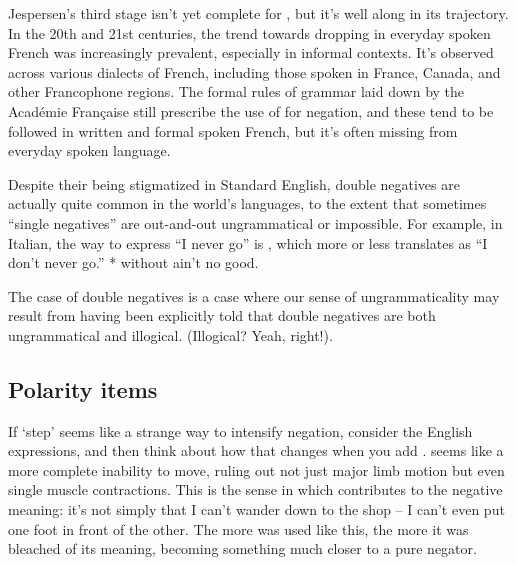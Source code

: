 Jespersen's third stage isn't yet complete for , but it's well along in its trajectory. In the 20th and 21st centuries, the trend towards  dropping in everyday spoken French was increasingly prevalent, especially in informal contexts. It's observed across various dialects of French, including those spoken in France, Canada, and other Francophone regions. The formal rules of grammar laid down by the Académie Française still prescribe the use of  for negation, and these tend to be followed in written and formal spoken French, but it's often missing from everyday spoken language.

\begin{tcolorbox}[title=The normality of double negatives, colback=white, parbox] \label{sec:double-negs}
\setlength{\parindent}{1.5em}
    \noindent Despite their being stigmatized in Standard English, double negatives are actually quite common in the world's languages, to the extent that sometimes \enquote{single negatives} are out-and-out ungrammatical or impossible. For example, in Italian, the way to express \enquote{I never go} is , which more or less translates as \enquote{I don't never go.} * without  ain't no good.
    
    The case of double negatives is a case where our sense of ungrammaticality may result from having been explicitly told that double negatives are both ungrammatical and illogical. (Illogical? Yeah, right!). 
\end{tcolorbox}


\subsection{Polarity items}

If  `step' seems like a strange way to intensify negation, consider the English expressions,  and then think about how that changes when you add .  seems like a more complete inability to move, ruling out not just major limb motion but even single muscle contractions. This is the sense in which  contributes to the negative meaning: it's not simply that I can't wander down to the shop -- I can't even put one foot in front of the other. The more  was used like this, the more it was bleached of its meaning, becoming something much closer to a pure negator.

